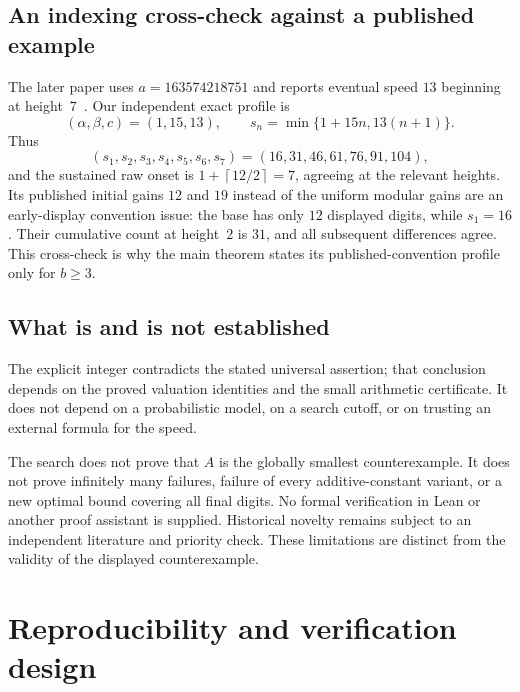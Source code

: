 \documentclass[11pt,a4paper]{article}
\theoremstyle{definition}
\theoremstyle{remark}
\newcommand{\ceil}[1]{\left\lceil #1\right\rceil}
\begin{document}
\subsection{An indexing cross-check against a published example}
The later paper uses $a=163574218751$ and reports eventual speed $13$ beginning at height~$7$~\cite[arXiv version, p.~10]{RipaOnnis2022}. Our independent exact profile is
\[
 (\alpha,\beta,c)=(1,15,13),\qquad
 s_n=\min\{1+15n,13(n+1)\}.
\]
Thus
\[
 (s_1,s_2,s_3,s_4,s_5,s_6,s_7)
 =(16,31,46,61,76,91,104),
\]
and the sustained raw onset is $1+\ceil{12/2}=7$, agreeing at the relevant heights. Its published initial gains $12$ and $19$ instead of the uniform modular gains are an early-display convention issue: the base has only $12$ displayed digits, while $s_1=16$. Their cumulative count at height~$2$ is $31$, and all subsequent differences agree. This cross-check is why the main theorem states its published-convention profile only for $b\ge3$.

\subsection{What is and is not established}
The explicit integer contradicts the stated universal assertion; that conclusion depends on the proved valuation identities and the small arithmetic certificate. It does not depend on a probabilistic model, on a search cutoff, or on trusting an external formula for the speed.

The search does not prove that $A$ is the globally smallest counterexample. It does not prove infinitely many failures, failure of every additive-constant variant, or a new optimal bound covering all final digits. No formal verification in Lean or another proof assistant is supplied. Historical novelty remains subject to an independent literature and priority check. These limitations are distinct from the validity of the displayed counterexample.

\section{Reproducibility and verification design}
\label{sec:reproduce}
\end{document}
